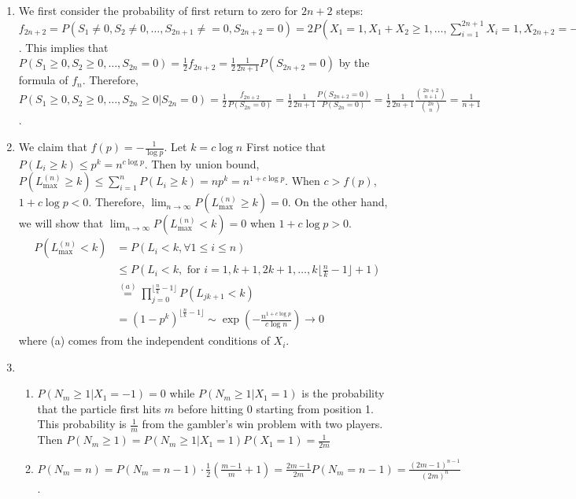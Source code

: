 \documentclass{article}
\begin{document}
\courseheader
{}

\begin{enumerate}
\item We first consider the probability
of first return to zero for $2n+2$ steps:
$f_{2n+2}=P(S_1\neq 0, S_2\neq 0, \dots, S_{2n+1}\neq =0,
S_{2n+2}=0)=2P(X_1=1,X_1+X_2\geq 1,\dots, \sum_{i=1}^{2n+1}X_i=1,X_{2n+2}=-1)=2P(S_1\geq 0,
S_2\geq 0,\dots, S_{2n}=0)$.
This implies that $P(S_1\geq 0,
S_2\geq 0,\dots, S_{2n}=0)=\frac{1}{2}f_{2n+2}
=\frac{1}{2}\frac{1}{2n+1}P(S_{2n+2}=0)$ by the formula of $f_{n}$.
Therefore,
$P(S_1\geq 0,
S_2\geq 0,\dots,S_{2n}\geq 0| S_{2n}=0)
=\frac{1}{2}\frac{f_{2n+2}}{P(S_{2n}=0)}
=\frac{1}{2}\frac{1}{2n+1}\frac{P(S_{2n+2}=0)}{P(S_{2n}=0)}=\frac{1}{2}\frac{1}{2n+1}\frac{\binom{2n+2}{n+1}}{\binom{2n}{n}}=\frac{1}{n+1}$.
\item We claim that $f(p)=-\frac{1}{\log p}$.
Let $k=c\log n$
First notice that $P(L_i \geq k) \leq p^k = n^{c\log p}$. Then by union bound,
$P(L^{(n)}_{\max} \geq k)
\leq \sum_{i=1}^n P(L_i \geq k)=np^k=n^{1+c\log p}$.
When $c>f(p)$, $1+c\log p < 0$. Therefore,
$\lim_{n\to\infty}P(L^{(n)}_{\max} \geq k) = 0$.
On the other hand, we will show that
$\lim_{n\to\infty}P(L^{(n)}_{\max} < k) = 0$
when $1+c\log p >0$.
\begin{align*}
    P(L^{(n)}_{\max} < k) &= 
    P(L_i < k, \forall 1\leq i \leq n)
    \\
    &\leq P(L_i <k, \textrm{ for } i=1,k+1,2k+1,
    \dots, k\lfloor \frac{n}{k} - 1\rfloor +1)\\
    &\stackrel{(a)}{=}\prod_{j=0}^{\lfloor \frac{n}{k} - 1\rfloor}P(L_{jk+1} < k) \\
    &=(1-p^k)^{\lfloor \frac{n}{k} - 1\rfloor} 
    \sim \exp(-\frac{n^{1+c\log p}}{c\log n})
    \to 0
\end{align*}
where (a) comes from the independent conditions
of $X_i$.
\item
\begin{enumerate}
    \item $P(N_m \geq 1 |X_1=-1)=0$ while
    $P(N_m \geq 1 | X_1=1)$ is the probability
    that the particle first hits $m$ before hitting
    0 starting from position 1. This probability
    is $\frac{1}{m}$ from the gambler's win problem
    with two players. Then
    $P(N_m \geq 1)=P(N_m \geq 1 | X_1=1)P(X_1=1)=\frac{1}{2m}$
    \item $P(N_m = n)=P(N_m=n-1)\cdot \frac{1}{2}(\frac{m-1}{m}+1)=
    \frac{2m-1}{2m} P(N_m=n-1)=
   \frac{(2m-1)^{n-1}}{(2m)^n}$.
\end{enumerate}

\end{enumerate}
\end{document}
